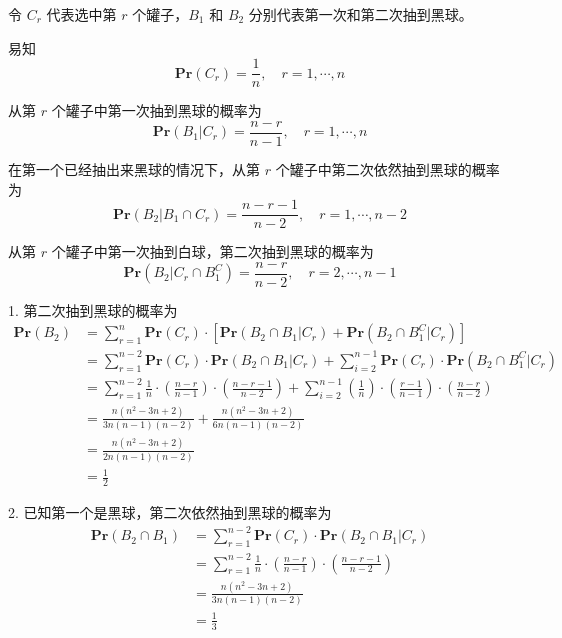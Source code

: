 \documentclass[12pt, a4paper, oneside]{ctexart}
\begin{document}
\begin{solution}
  令 $C_r$ 代表选中第 $r$ 个罐子，$B_1$ 和 $B_2$ 分别代表第一次和第二次抽到黑球。

  易知 $$ \textbf{Pr}(C_r) = \frac{1}{n}, \quad r=1,\cdots,n $$

  从第 $r$ 个罐子中第一次抽到黑球的概率为 $$ \textbf{Pr}(B_1|C_r) = \frac{n-r}{n-1}, \quad r=1,\cdots,n $$

  在第一个已经抽出来黑球的情况下，从第 $r$ 个罐子中第二次依然抽到黑球的概率为 $$ \textbf{Pr}(B_2|B_1\cap C_r) = \frac{n-r-1}{n-2}, \quad r=1,\cdots,n-2 $$

  从第 $r$ 个罐子中第一次抽到白球，第二次抽到黑球的概率为
  $$\textbf{Pr}(B_2 |C_r\cap B_1^C) = \frac{n-r}{n-2}, \quad r=2,\cdots,n-1$$


  1. 第二次抽到黑球的概率为
  $$ \begin{aligned} \textbf{Pr}(B_2)
       & = \sum_{r=1}^n \textbf{Pr}(C_r)\cdot [\textbf{Pr}(B_2\cap B_1|C_r) + \textbf{Pr}(B_2 \cap B_1^C|C_r)]                                                              \\
       & = \sum^{n-2}_{r=1} \textbf{Pr}(C_r) \cdot \textbf{Pr}(B_2 \cap B_1| C_r) + \sum^{n-1}_{i=2}\textbf{Pr}(C_r)\cdot \textbf{Pr}(B_2 \cap B_1^C|C_r)                   \\
       & = \sum_{r=1}^{n-2} \frac{1}{n}\cdot (\frac{n-r}{n-1})\cdot (\frac{n-r-1}{n-2})  +  \sum^{n-1}_{i=2} (\frac{1}{n})    \cdot (\frac{r-1}{n-1})\cdot(\frac{n-r}{n-2}) \\
       & = \frac{n(n^2-3n+2)}{3n(n-1)(n-2)} + \frac{n(n^2-3n+2)}{6n(n-1)(n-2)}                                                                                              \\ &= \frac{n(n^2-3n+2)}{2n(n-1)(n-2)}\\
       & =\frac{1}{2}
    \end{aligned} $$

  2. 已知第一个是黑球，第二次依然抽到黑球的概率为 $$ \begin{aligned} \textbf{Pr}(B_2\cap B_1) & = \sum_{r=1}^{n-2} \textbf{Pr}(C_r)\cdot \textbf{Pr}(B_2\cap B_1|C_r) \\ &=\sum_{r=1}^{n-2} \frac{1}{n}\cdot (\frac{n-r}{n-1})\cdot (\frac{n-r-1}{n-2})\\
                                         & = \frac{n(n^2-3n+2)}{3n(n-1)(n-2)}                                    \\
                                         & = \frac{1}{3}\end{aligned} $$
\end{solution}
\end{document}
